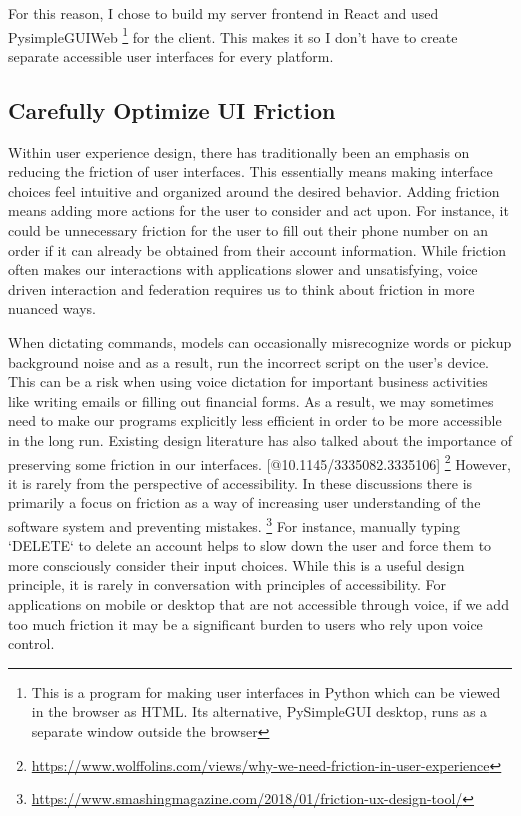\documentclass[manuscript,screen,review]{acmart}
\begin{document}
{For this reason, I chose to build my server frontend in React and used PysimpleGUIWeb \footnote{This is a program for making user interfaces in Python which can be viewed in the browser as HTML. Its alternative, PySimpleGUI desktop, runs as a separate window outside the browser} for the client. This makes it so I don't have to create separate accessible user interfaces for every platform.

\subsection{Carefully Optimize UI Friction}

Within user experience design, there has traditionally been an emphasis on reducing the friction of user interfaces. This essentially means making interface choices feel intuitive and organized around the desired behavior. Adding friction means adding more actions for the user to consider and act upon. For instance, it could be unnecessary friction for the user to fill out their phone number on an order if it can already be obtained from their account information. While friction often makes our interactions with applications slower and unsatisfying, voice driven interaction and federation requires us to think about friction in more nuanced ways.

When dictating commands, models can occasionally misrecognize words or pickup background noise and as a result, run the incorrect script on the user's device. This can be a risk when using voice dictation for important business activities like writing emails or filling out financial forms. As a result, we may sometimes need to make our programs explicitly less efficient in order to be more accessible in the long run. Existing design literature has also talked about the importance of preserving some friction in our interfaces. [@10.1145/3335082.3335106] \footnote{\url{https://www.wolffolins.com/views/why-we-need-friction-in-user-experience}} However, it is rarely from the perspective of accessibility. In these discussions there is primarily a focus on friction as a way of increasing user understanding of the software system and preventing mistakes.
\footnote{\url{https://www.smashingmagazine.com/2018/01/friction-ux-design-tool/}} For instance, manually typing `DELETE` to delete an account helps to slow down the user and force them to more consciously consider their input choices. While this is a useful design principle, it is rarely in conversation with principles of accessibility. For applications on mobile or desktop that are not accessible through voice, if we add too much friction it may be a significant burden to users who rely upon voice control.

}
\end{document}
